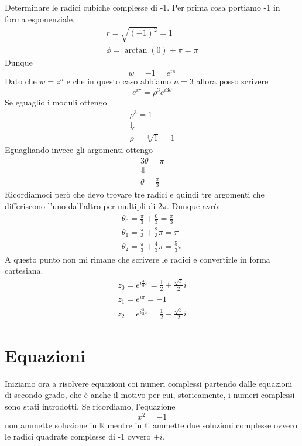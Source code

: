 \begin{example}
	Determinare le radici cubiche complesse di -1.
	Per prima cosa portiamo -1 in forma esponenziale.
	\begin{gather*}
		r = \sqrt{(-1)^2} = 1 \\
		\phi = \arctan(0) + \pi = \pi
	\end{gather*}
	Dunque
	\begin{equation*}
		w = -1 = e^{i \pi}
	\end{equation*}
	Dato che $w = z^n$ e che in questo caso abbiamo $n = 3$ allora posso scrivere
	\begin{equation*}
		e^{i \pi} = \rho^3 e^{i 3 \theta}
	\end{equation*}
	Se eguaglio i moduli ottengo
	\begin{gather*}
		\rho^3 = 1 \\
		\Downarrow \\
		\rho = \sqrt[3]{1} = 1
	\end{gather*}
	Eguagliando invece gli argomenti ottengo
	\begin{gather*}
		3 \theta = \pi \\
		\Downarrow     \\
		\theta = \frac{\pi}{3}
	\end{gather*}
	Ricordiamoci per\`o che devo trovare tre radici e quindi tre argomenti che differiscono
	l'uno dall'altro per multipli di $2 \pi$.
	Dunque avr\`o:
	\begin{gather*}
		\theta_0 = \frac{\pi}{3} + \frac{0}{3} = \frac{\pi}{3} \\
		\theta_1 = \frac{\pi}{3} + \frac{2}{3} \pi = \pi       \\
		\theta_2 = \frac{\pi}{3} + \frac{4}{3} \pi = \frac{5}{3} \pi
	\end{gather*}
	A questo punto non mi rimane che scrivere le radici e convertirle in forma cartesiana.
	\begin{gather*}
		z_0 = e^{i \frac{4}{3} \pi} = \frac{1}{2} + \frac{\sqrt{3}}{2} i \\
		z_1 = e^{i \pi} = -1                                             \\
		z_2 = e^{i \frac{5}{3} \pi} = \frac{1}{2} - \frac{\sqrt{3}}{2} i
	\end{gather*}
\end{example}

\section{Equazioni}
Iniziamo ora a risolvere equazioni coi numeri complessi partendo dalle equazioni di secondo grado,
che \`e anche il motivo per cui, storicamente, i numeri complessi sono stati introdotti.
Se ricordiamo, l'equazione
\begin{equation*}
	x^2 = -1
\end{equation*}
non ammette soluzione in $\mathbb{R}$ mentre in $\mathbb{C}$ ammette due soluzioni complesse
ovvero le radici quadrate complesse di -1 ovvero $\pm i$.


